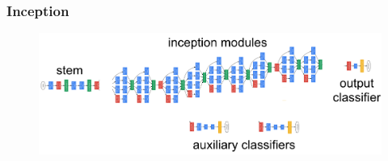 \documentclass[aspectratio=169]{beamer}
\newcommand\imageright[1]{ %
    \caption*{\scalebox{.5}{\textcolor{lightgray}{\textcopyright~#1}}} %
}
\begin{document}
\begin{frame}
\frametitle{Inception}

\begin{figure}
    \includegraphics[width=\linewidth]{inception.png}
    \imageright{Joe Marino}
\end{figure}
\end{frame}
\end{document}
